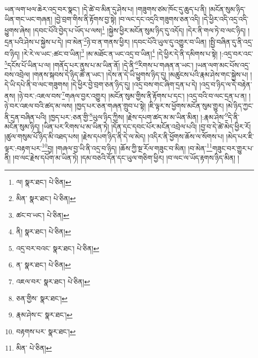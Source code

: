 ཡན་ལག་ཕལ་ཆེར་འདྲ་བར་སྣང་། །དེ་ཚེ་བ་མིན་དུ་ཤེས་པ། །གཟུགས་ཙམ་ཁོང་དུ་ཆུད་པ་ནི། །མངོན་སུམ་ཉིད་ཡིན་གང་ཡང་གཞན། །བྱེ་བྲག་གིས་ནི་རྟོགས་བྱ་སྟེ། །བ་ལང་དང་འདྲའི་གཟུགས་ཅན་འདི། །དེ་ཕྱིར་འདི་འདྲ་འདི་ཕྱུགས་ཞེས། །དབང་པོའི་བྱེད་པ་ཡོད་པ་ལས།\footnote{ལ།  སྣར་ཐང་།  པེ་ཅིན། } །སྐྱེས་ཕྱིར་མངོན་སུམ་ཉིད་དུ་འདོད། །དེར་ནི་གལ་ཏེ་བ་ལང་ཉིད། །དྲན་པའི་ཤེས་པ་སྐྱེས་པ་དེ། །བ་མེན་\footnote{མིན་  སྣར་ཐང་།  པེ་ཅིན། }ཉེ་བ་ན་གནས་ཕྱིར། །དབང་པོའི་ཡུལ་དུ་འགྱུར་བ་ཡིན། །སྤྱི་བཞིན་དུ་ནི་འདྲ་བ་ཉིད། །རེ་རེ་ལ་ཡང་:ཚང་བ་ཡིན།\footnote{ཚང་བ་ཡང་།  པེ་ཅིན། } །མ་མཐོང་ན་ཡང་འདྲ་བ་ཡིན།\footnote{ནི།  སྣར་ཐང་།  པེ་ཅིན། } །དེ་ཕྱིར་དེ་ནི་དམིགས་པ་སྟེ། །:འདྲ་བར་འང་\footnote{འདྲ་བར་བའང་  སྣར་ཐང་།  པེ་ཅིན། }དངོས་པོ་ཡིན་པ་ལ། །གནོད་པར་ནུས་པ་མ་ཡིན་ནོ། །དེ་ནི་\footnote{ན་  སྣར་ཐང་།  པེ་ཅིན། }རིགས་པ་གཞན་ན་ཡང་། །ཡན་ལག་མང་པོས་འདྲ་བས་འབྲེལ། །གནས་སྐབས་དེ་ཉིད་ཚེ་ན་ཡང་། །དེས་ན་དེ་ཡི་ཕྱུགས་ཉིད་དུ། །མཚུངས་པའི་རྣམ་ཤེས་གང་སྐྱེས་པ། །དེ་ཡི་དཔེ་ནི་བ་ལང་གཟུགས། །དེ་ཕྱིར་བྱེ་བྲག་ཅན་ཉིད་དུ། །འདྲ་བས་གང་ཞིག་དྲན་པ་དེ། །འདྲ་བ་ཉིད་ལ་དེ་བརྟེན་ནས། །ཉེ་བར་:འཇལ་བས་\footnote{འཇལ་བར་  སྣར་ཐང་།  པེ་ཅིན། }གཞལ་བྱར་འགྱུར། །མངོན་སུམ་གྱིས་ནི་རྟོགས་པ་དང་། །འདྲ་བའི་བ་ལང་དྲན་པ་ན། །ཉེ་བར་འཇལ་བའི་ཚད་མ་ལས། །ཁྱད་པར་ཅན་གཞན་གྲུབ་པ་སྟེ། །ཇི་ལྟར་ས་ཕྱོགས་མངོན་སུམ་གྱུར། །མེ་ཉིད་ཀྱང་ནི་དྲན་བཞིན་པའི། །ཁྱད་པར་:ཅན་གྱི་\footnote{ཅན་གྱིས་  སྣར་ཐང་། }ཡུལ་ཉིད་ཀྱིས། །རྗེས་དཔག་ཚད་མ་མ་ཡིན་མིན། །:རྣམ་ཤེས་\footnote{རྣམ་ཤེས་ང་  སྣར་ཐང་། }དེ་ནི་མངོན་སུམ་ཉིད། །ཡིན་པར་རིགས་པ་མ་ཡིན་ཏེ། །དོན་དང་དབང་པོར་མངོན་འབྲེལ་པའི། །བྱ་བ་དེ་ཚེ་མེད་ཕྱིར་རོ། །ཚུལ་གསུམ་པོ་ཉིད་མི་འཐད་པས། །རྗེས་དཔག་ཉིད་ནི་དེ་ལ་མེད། །འདིར་ནི་ཕྱོགས་ཆོས་ལ་སོགས་པ། །མེད་པར་ཇི་ལྟར་:བརྟག་པར་\footnote{བརྟགས་པར་  སྣར་ཐང་། }བྱ། །གཞལ་བྱ་ཡི་ནི་འདྲ་བ་ཉིད། །ཆོས་ཀྱི་སྔ་རོལ་གཟུང་བ་མིན། །བ་མེན་\footnote{མིན་  པེ་ཅིན། }གཟུང་བར་གྱུར་པ་ནི། །བ་ལང་རྗེས་དཔོག་མ་ཡིན་ཏེ། །དམ་བཅའི་དོན་དང་ཡུལ་གཅིག་ཕྱིར། །བ་ལང་ལ་ཡོད་རྟགས་ཉིད་མིན། །
